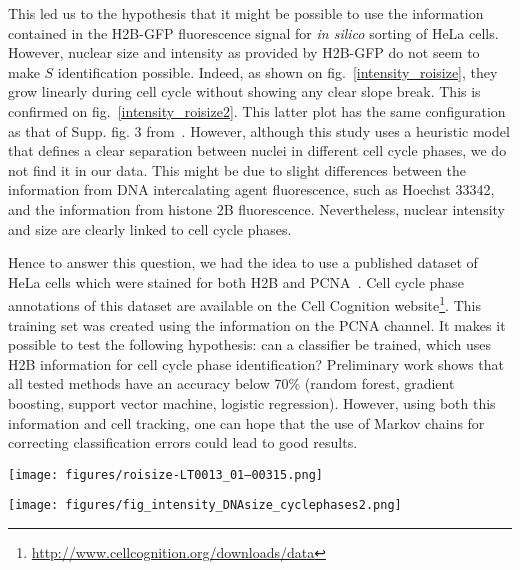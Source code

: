 This led us to the hypothesis that it might be possible to use the information contained in the H2B-GFP fluorescence signal for \textit{in silico} sorting of HeLa cells. However, nuclear size and intensity as provided by H2B-GFP do not seem to make $S$ identification possible. Indeed, as shown on fig.~\ref{intensity_roisize}, they grow linearly during cell cycle without showing any clear slope break. This is confirmed on fig.~\ref{intensity_roisize2}. This latter plot has the same configuration as that of Supp. fig. 3 from~\cite{pmid17401369}. However, although this study uses a heuristic model that defines a clear separation between nuclei in different cell cycle phases, we do not find it in our data. This might be due to slight differences between the information from DNA intercalating agent fluorescence, such as Hoechst 33342, and the information from histone 2B fluorescence. Nevertheless, nuclear intensity and size are clearly linked to cell cycle phases.

Hence to answer this question, we had the idea to use a published dataset of HeLa cells which were stained for both H2B and PCNA~\cite{cellcognition}. Cell cycle phase annotations of this dataset are available on the Cell Cognition website\footnote{\href{http://www.cellcognition.org/downloads/data}{http://www.cellcognition.org/downloads/data}}. This training set was created using the information on the PCNA channel. It makes it possible to test the following hypothesis: can a classifier be trained, which uses H2B information for cell cycle phase identification? Preliminary work shows that all tested methods have an accuracy below 70\% (random forest, gradient boosting, support vector machine, logistic regression). However, using both this information and cell tracking, one can hope that the use of Markov chains for correcting classification errors could lead to good results.
\begin{figure*}[ht!]
\centerline{\texttt{[image: figures/roisize-LT0013\_01--00315.png]}
}
\caption{Example of the time evolutions of nuclear size ("roisize", top left and bottom) and nuclear intensity ("total intensity", top right) for all complete trajectories of a control experiment from the Mitocheck dataset. As discussed in the text, no clear slope break is seen for most trajectories for any of the two indicators, hence preventing the delimitation of cell cycle phases using only this information.}
\label{intensity_roisize}
\end{figure*}
\begin{figure*}[ht!]
\centerline{\texttt{[image: figures/fig\_intensity\_DNAsize\_cyclephases2.png]}
}
\caption{DNA intensity and size as provided by H2B-GFP information is not sufficient to differenciate between the different cell cycle phases. Data and labelling come from the PCNA dataset.}
\label{intensity_roisize2}
\end{figure*}
\clearpage
